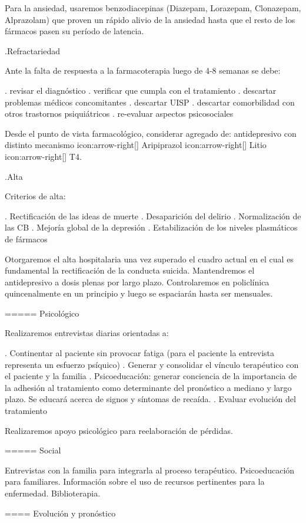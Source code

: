 \documentclass[encares.tex]{subfiles}
\begin{document}
Para la ansiedad, usaremos benzodiacepinas (Diazepam, Lorazepam, Clonazepam, Alprazolam) que proven un rápido alivio de la ansiedad hasta que el resto de los fármacos pasen su período de latencia.

.Refractariedad

Ante la falta de respuesta a la farmacoterapia luego de 4-8 semanas se debe:

. revisar el diagnóstico
. verificar que cumpla con el tratamiento
. descartar problemas médicos concomitantes
. descartar UISP
. descartar comorbilidad con otros trastornos psiquiátricos
. re-evaluar aspectos psicosociales

Desde el punto de vista farmacológico, considerar agregado de: antidepresivo con distinto mecanismo icon:arrow-right[] Aripiprazol icon:arrow-right[] Litio icon:arrow-right[] T4.

.Alta

Criterios de alta:

. Rectificación de las ideas de muerte
. Desaparición del delirio
. Normalización de las CB
. Mejoría global de la depresión
. Estabilización de los niveles plasmáticos de fármacos

Otorgaremos el alta hospitalaria una vez superado el cuadro actual en el cual es fundamental la rectificación de la conducta suicida. Mantendremos el antidepresivo a dosis plenas por largo plazo. Controlaremos en policlínica quincenalmente en un principio y luego se espaciarán hasta ser mensuales.

===== Psicológico

Realizaremos entrevistas diarias orientadas a:

. Continentar al paciente sin provocar fatiga (para el paciente la entrevista representa un esfuerzo psíquico)
. Generar y consolidar el vínculo terapéutico con el paciente y la familia
. Psicoeducación: generar conciencia de la importancia de la adhesión al tratamiento como determinante del pronóstico a mediano y largo plazo. Se educará acerca de signos y síntomas de recaída.
. Evaluar evolución del tratamiento

Realizaremos apoyo psicológico para reelaboración de pérdidas.

===== Social

Entrevistas con la familia para integrarla al proceso terapéutico. Psicoeducación para familiares. Información sobre el uso de recursos pertinentes para la enfermedad. Biblioterapia.

==== Evolución y pronóstico
\end{document}
